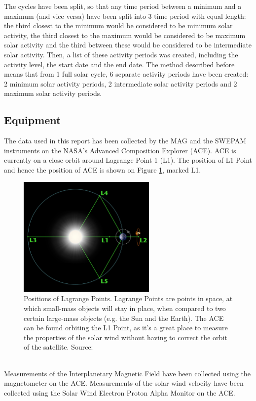 \documentclass[12pt]{article}
\begin{document}
        The cycles have been split, so that any time period between a minimum and a maximum (and vice versa) have been split into 3 time period with equal length: the third closest to the minimum would be considered to be minimum solar activity, the third closest to the maximum would be considered to be maximum solar activity and the third between these would be considered to be intermediate solar activity. Then, a list of these activity periods was created, including the activity level, the start date and the end date. The method described before means that from 1 full solar cycle, 6 separate activity periods have been created: 2 minimum solar activity periods, 2 intermediate solar activity periods and 2 maximum solar activity periods.
    \subsection{Equipment}\label{sec:equipment}
        The data used in this report has been collected by the MAG and the SWEPAM instruments on the NASA's Advanced Composition Explorer (ACE)\cite{1998ace}. ACE is currently on a close orbit around Lagrange Point 1 (L1). The position of L1 Point and hence the position of ACE is shown on Figure \ref{fig:l1}, marked L1.\\
        \begin{figure}[t!]
            \centering
            \includegraphics[width=0.6\textwidth]{fig_theory/lagrange.jpg}
            \caption{Positions of Lagrange Points. Lagrange Points are points in space, at which small-mass objects will stay in place, when compared to two certain large-mass objects (e.g. the Sun and the Earth). The ACE can be found orbiting the L1 Point, as it's a great place to measure the properties of the solar wind without having to correct the orbit of the satellite. Source: \cite{lagrangeimage}}
            \label{fig:l1}
        \end{figure}\\
        Measurements of the Interplanetary Magnetic Field have been collected using the magnetometer on the ACE\cite{1998acemag}. Measurements of the solar wind velocity have been collected using the Solar Wind Electron Proton Alpha Monitor on the ACE\cite{1998aceswepam}.
\end{document}
